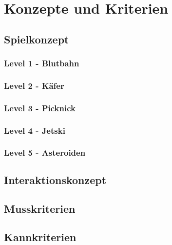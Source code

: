 \section{Konzepte und Kriterien}

\subsection{Spielkonzept}

\subsubsection{Level 1 - Blutbahn}

\subsubsection{Level 2 - Käfer}

\subsubsection{Level 3 - Picknick}

\subsubsection{Level 4 - Jetski}

\subsubsection{Level 5 - Asteroiden}

\subsection{Interaktionskonzept}

\subsection{Musskriterien}

\subsection{Kannkriterien}
